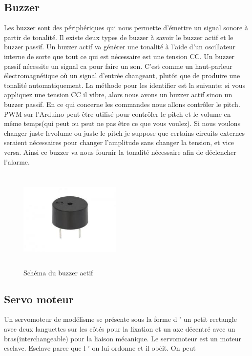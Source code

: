 \documentclass[12pt, openany]{report}
\begin{document}
          \newpage      	
   \subsection{ Buzzer}
   Les buzzer sont des périphériques qui nous permette d'émettre un signal sonore à partir de tonalité. Il existe deux types de buzzer à savoir le buzzer actif et le buzzer passif.	  		         							    Un buzzer actif va générer une tonalité à l'aide d'un oscillateur interne de sorte que tout ce qui est nécessaire est une tension CC. Un buzzer passif nécessite un signal ca pour faire un son. C'est comme un haut-parleur électromagnétique où un signal d'entrée changeant, plutôt que de produire une tonalité automatiquement.
   La méthode pour les identifier est la suivante: si vous appliquez une tension CC il vibre, alors nous avons un buzzer actif sinon un buzzer passif.
   En ce qui concerne les commandes nous allons contrôler le pitch. PWM sur l'Arduino peut être utilisé pour contrôler le pitch et le volume en même temps(qui peut ou peut ne pas être ce que vous voulez). Si nous voulons changer juste levolume ou juste le pitch je suppose que certains circuits externes seraient nécessaires pour changer l'amplitude sans changer la tension, et vice versa. Ainsi ce buzzer va nous fournir la tonalité nécessaire afin de déclencher l'alarme.
  \begin{figure}[!h]
                  \centering
 \includegraphics[height=5cm,width=5cm]{composantes/buzzer.jpg} 
           \caption{Schéma du buzzer actif}
                 		          		
  \end{figure}  		         				    	\subsection{Servo moteur}	
  Un servomoteur de modélisme se présente sous la forme d ’ un petit rectangle avec deux languettes sur les côtés pour la fixation et un axe décentré avec un bras(interchangeable) pour la liaison mécanique. Le servomoteur est un moteur esclave. Esclave parce que l ’ on lui ordonne et il obéit. On peut
\end{document}
